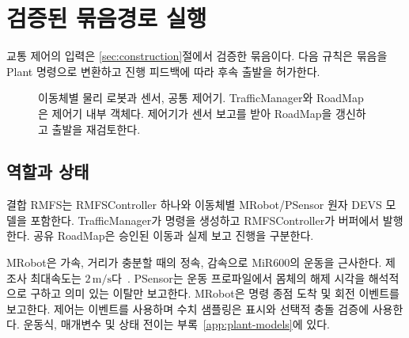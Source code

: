 \documentclass[11pt,a4paper]{article}
\theoremstyle{remark}
\begin{document}
\section{검증된 묶음경로 실행}
\label{sec:execution}
교통 제어의 입력은 \ref{sec:construction}절에서 검증한 묶음이다. 다음 규칙은 묶음을 Plant 명령으로 변환하고 진행 피드백에 따라 후속 출발을 허가한다.
\begin{figure}[htbp]
\centering
{}
\caption{이동체별 물리 로봇과 센서, 공통 제어기. TrafficManager와 RoadMap은 제어기 내부 객체다. 제어기가 센서 보고를 받아 RoadMap을 갱신하고 출발을 재검토한다.}
\label{fig:architecture}
\end{figure}

\subsection{역할과 상태}
결합 RMFS는 RMFSController 하나와 이동체별 MRobot/PSensor 원자 DEVS 모델을 포함한다. TrafficManager가 명령을 생성하고 RMFSController가 버퍼에서 발행한다. 공유 RoadMap은 승인된 이동과 실제 보고 진행을 구분한다.

MRobot은 가속, 거리가 충분할 때의 정속, 감속으로 MiR600의 운동을 근사한다. 제조사 최대속도는 $2\,\mathrm{m/s}$다~\cite{mir600}. PSensor는 운동 프로파일에서 몸체의 해제 시각을 해석적으로 구하고 의미 있는 이탈만 보고한다. MRobot은 명령 종점 도착 및 회전 이벤트를 보고한다. 제어는 이벤트를 사용하며 수치 샘플링은 표시와 선택적 충돌 검증에 사용한다. 운동식, 매개변수 및 상태 전이는 부록~\ref{app:plant-models}에 있다.
\end{document}
